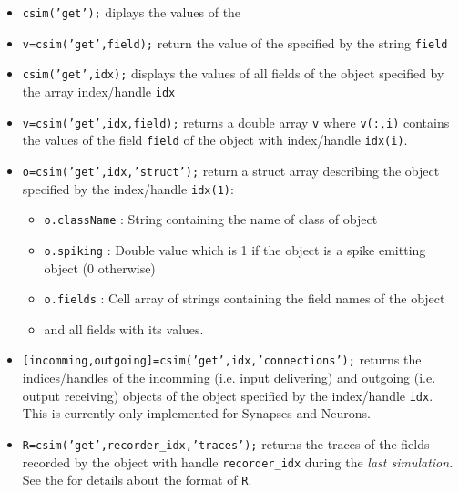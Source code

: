 \begin{itemize}

  \item \texttt{csim('get');} diplays the values of the 

  \item \texttt{v=csim('get',field);} return the value of the
     specified by the string \texttt{field}

  \item \texttt{csim('get',idx);} displays the values of all fields of the
    object specified by the array index/handle \texttt{idx}

  \item \texttt{v=csim('get',idx,field);} returns a double array
   \texttt{v} where \texttt{v(:,i)} contains the values of the field
   \texttt{field} of the object with index/handle \texttt{idx(i)}.

 \item \texttt{o=csim('get',idx,'struct');} return a struct array
   describing the object specified by the index/handle
   \texttt{idx(1)}:

   \begin{itemize}
   \item \texttt{o.className} : String containing the name of class of object
   \item \texttt{o.spiking} : Double value which is 1 if the object is a
     spike emitting object (0 otherwise)
   \item \texttt{o.fields} : Cell array of strings containing the field
     names of the object
   \item and all fields with its values.
   \end{itemize}
   
 \item \texttt{[incomming,outgoing]=csim('get',idx,'connections');}
   returns the indices/handles of the incomming (i.e. input
   delivering) and outgoing (i.e. output receiving) objects of the
   object specified by the index/handle \texttt{idx}. This is
   currently only implemented for Synapses and Neurons.
   
 \item \texttt{R=csim('get',recorder\_idx,'traces');} returns the
   traces of the fields recorded by the
    object with handle
   \texttt{recorder\_idx} during the \emph{last simulation}. See the
    for details about
   the format of \texttt{R}.

\end{itemize}

